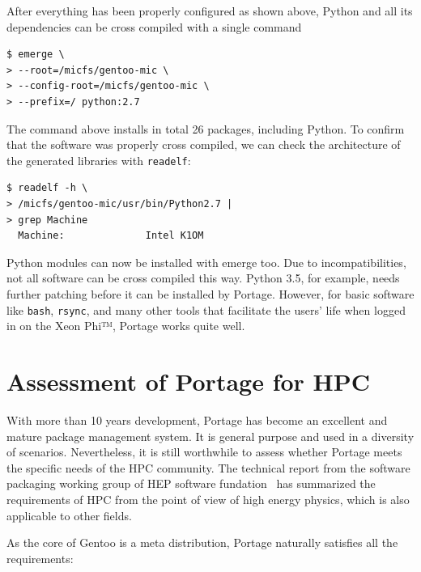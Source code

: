 \documentclass[a4paper,conference]{IEEEtran}
\begin{document}
After everything has been properly configured as shown above, Python
and all its dependencies can be cross compiled with a single command
\begin{verbatim}
$ emerge \
> --root=/micfs/gentoo-mic \
> --config-root=/micfs/gentoo-mic \
> --prefix=/ python:2.7
\end{verbatim}

The command above installs in total 26 packages, including Python.
To confirm that the software was properly cross compiled, we can check
the architecture of the generated libraries with \verb|readelf|:
\begin{verbatim}
$ readelf -h \
> /micfs/gentoo-mic/usr/bin/Python2.7 |
> grep Machine
  Machine:              Intel K1OM
\end{verbatim}

Python modules can now be installed with emerge too. Due to
incompatibilities, not all software can be cross compiled this way.
Python 3.5, for example, needs further patching before it can be
installed by Portage. However, for basic software like \verb|bash|,
\verb|rsync|, and many other tools that facilitate the users' life
when logged in on the Xeon Phi™, Portage works quite well.

\section{Assessment of Portage for HPC}

With more than 10 years development, Portage has become an excellent
and mature package management system. It is general purpose and used
in a diversity of scenarios. Nevertheless, it is still worthwhile to
assess whether Portage meets the specific needs of the HPC
community. The technical report from the software packaging working
group of HEP software fundation~\cite{hsf:package} has summarized the
requirements of HPC from the point of view of high energy physics,
which is also applicable to other fields.

As the core of Gentoo is a meta distribution, Portage naturally satisfies
all the requirements:
\end{document}
